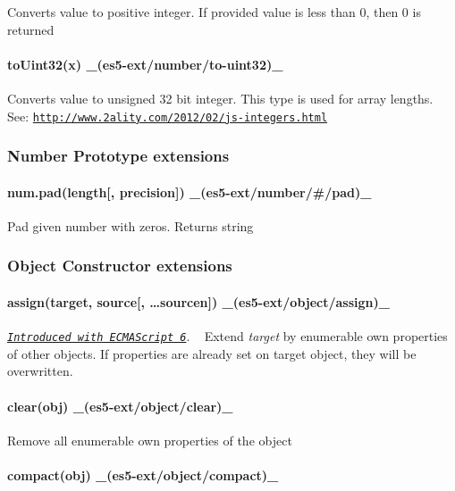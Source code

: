 Converts value to positive integer. If provided value is less than 0, then 0 is returned

\paragraph*{to\+Uint32(x) \+\_\+(es5-\/ext/number/to-\/uint32)\+\_\+}

Converts value to unsigned 32 bit integer. This type is used for array lengths. See\+: \href{http://www.2ality.com/2012/02/js-integers.html}{\tt http\+://www.\+2ality.\+com/2012/02/js-\/integers.\+html}

\subsubsection*{Number Prototype extensions}

\paragraph*{num.\+pad(length\mbox{[}, precision\mbox{]}) \+\_\+(es5-\/ext/number/\#/pad)\+\_\+}

Pad given number with zeros. Returns string

\subsubsection*{Object Constructor extensions}

\paragraph*{assign(target, source\mbox{[}, …sourcen\mbox{]}) \+\_\+(es5-\/ext/object/assign)\+\_\+}

\href{http://people.mozilla.org/~jorendorff/es6-draft.html#sec-object.assign}{\tt {\itshape Introduced with E\+C\+M\+A\+Script 6}}. ~\newline
Extend {\itshape target} by enumerable own properties of other objects. If properties are already set on target object, they will be overwritten.

\paragraph*{clear(obj) \+\_\+(es5-\/ext/object/clear)\+\_\+}

Remove all enumerable own properties of the object

\paragraph*{compact(obj) \+\_\+(es5-\/ext/object/compact)\+\_\+}

